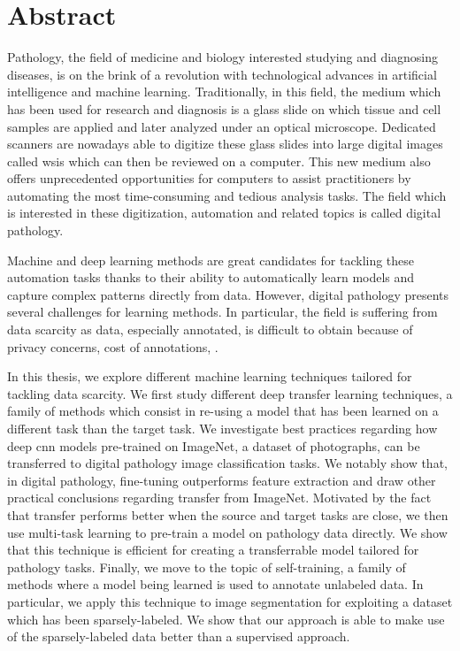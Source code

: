 \chapter*{Abstract}

Pathology, the field of medicine and biology interested studying and diagnosing diseases, is on the brink of a revolution with technological advances in artificial intelligence and machine learning. Traditionally, in this field, the medium which has been used for research and diagnosis is a glass slide on which tissue and cell samples are applied and later analyzed under an optical microscope. Dedicated scanners are nowadays able to digitize these glass slides into large digital images called \acrlong{wsi}s which can then be reviewed on a computer. This new medium also offers unprecedented opportunities for computers to assist practitioners by automating the most time-consuming and tedious analysis tasks. The field which is interested in these digitization, automation and related topics is called digital pathology.

Machine and deep learning methods are great candidates for tackling these automation tasks thanks to their ability to automatically learn models and capture complex patterns directly from data. However, digital pathology presents several challenges for learning methods. In particular, the field is suffering from data scarcity as data, especially annotated, is difficult to obtain because of privacy concerns, cost of annotations, \etc. 

In this thesis, we explore different machine learning techniques tailored for tackling data scarcity. We first study different deep transfer learning techniques, a family of methods which consist in re-using a model that has been learned on a different task than the target task. We investigate best practices regarding how deep \acrlong{cnn} models pre-trained on ImageNet, a dataset of photographs, can be transferred to digital pathology image classification tasks. We notably show that, in digital pathology, fine-tuning outperforms feature extraction and draw other practical conclusions regarding transfer from ImageNet. Motivated by the fact that transfer performs better when the source and target tasks are close, we then use multi-task learning to pre-train a model on pathology data directly. We show that this technique is efficient for creating a transferrable model tailored for pathology tasks. Finally, we move to the topic of self-training, a family of methods where a model being learned is used to annotate unlabeled data. In particular, we apply this technique to image segmentation for exploiting a dataset which has been sparsely-labeled. We show that our approach is able to make use of the sparsely-labeled data better than a supervised approach. 